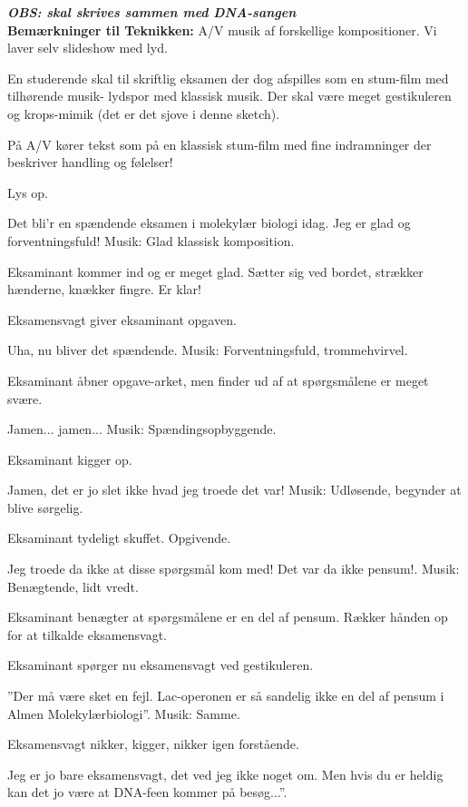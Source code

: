 \documentclass[a4paper,12pt]{article}
\begin{document}
\begin{sketch}

\emph{\textbf{OBS: skal skrives sammen med DNA-sangen}}\\


\textbf{Bemærkninger til Teknikken:}
A/V musik af forskellige kompositioner. Vi laver selv slideshow med lyd.



En studerende skal til skriftlig eksamen der dog afspilles som en stum-film med tilhørende musik-
lydspor med klassisk musik. Der skal være meget gestikuleren og krops-mimik (det er det sjove i denne sketch).

På A/V kører tekst som på en klassisk stum-film med fine indramninger der beskriver handling og følelser!

Lys op.

Det bli'r en spændende eksamen i molekylær biologi idag. Jeg er glad og forventningsfuld!
Musik: Glad klassisk komposition.

Eksaminant kommer ind og er meget glad. Sætter sig ved bordet, strækker hænderne, knækker fingre. Er klar!

Eksamensvagt giver eksaminant opgaven.

Uha, nu bliver det spændende.
Musik: Forventningsfuld, trommehvirvel.

Eksaminant åbner opgave-arket, men finder ud af at spørgsmålene er meget svære.

Jamen... jamen...
Musik: Spændingsopbyggende.

Eksaminant kigger op.

Jamen, det er jo slet ikke hvad jeg troede det var!
Musik: Udløsende, begynder at blive sørgelig.

Eksaminant tydeligt skuffet. Opgivende.

Jeg troede da ikke at disse spørgsmål kom med! Det var da ikke pensum!.
Musik: Benægtende, lidt vredt.


Eksaminant benægter at spørgsmålene er en del af pensum. Rækker hånden op for at tilkalde eksamensvagt.

Eksaminant spørger nu eksamensvagt ved gestikuleren.

”Der må være sket en fejl. Lac-operonen er så sandelig ikke en del af pensum i Almen Molekylærbiologi”.
Musik: Samme.

Eksamensvagt nikker, kigger, nikker igen forstående.

Jeg er jo bare eksamensvagt, det ved jeg ikke noget om. Men hvis du er heldig kan det jo være at DNA-feen kommer på besøg...”. 


\end{sketch}
\end{document}
